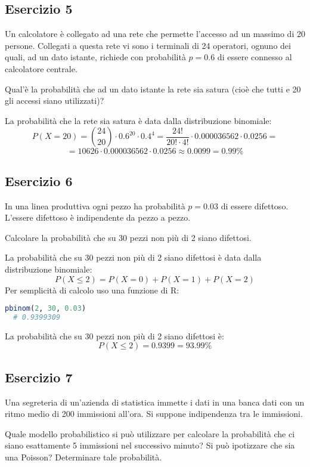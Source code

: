 \documentclass[a4paper]{article}
\theoremstyle{break}
\theoremstyle{break}
\theoremstyle{break}
\theoremstyle{break}
\begin{document}
\subsection{Esercizio 5}
Un calcolatore è collegato ad una rete che permette l'accesso ad un massimo di 20 persone.
Collegati a questa rete vi sono i terminali di 24 operatori, ognuno dei quali, ad un dato
istante, richiede con probabilità \( p = 0.6 \) di essere connesso al calcolatore centrale.

\noindent Qual'è la probabilità che ad un dato istante la rete sia satura (cioè che tutti
e 20 gli accessi siano utilizzati)?

\vspace{1em}
\noindent La probabilità che la rete sia satura è data dalla distribuzione binomiale:
\[
	P(X = 20) = \binom{24}{20} \cdot 0.6^{20} \cdot 0.4^4 = \frac{24!}{20! \cdot 4!} \cdot
	0.000036562 \cdot 0.0256 =
\]
\[
	= 10626 \cdot 0.000036562 \cdot 0.0256 \approx 0.0099 = 0.99\%
\]

\subsection{Esercizio 6}
In una linea produttiva ogni pezzo ha probabilità \( p = 0.03 \) di essere difettoso.
L'essere difettoso è indipendente da pezzo a pezzo.

\noindent Calcolare la probabilità che su 30 pezzi non più di 2 siano difettosi.

\vspace{1em}
\noindent La probabilità che su 30 pezzi non più di 2 siano difettosi è data dalla distribuzione
binomiale:
\[
	P(X \le 2) = P(X = 0) + P(X = 1) + P(X = 2)
\]
Per semplicità di calcolo uso una funzione di R:
\begin{lstlisting}[language=R]
  pbinom(2, 30, 0.03)
  # 0.9399309
\end{lstlisting}
La probabilità che su 30 pezzi non più di 2 siano difettosi è:
\[
	P(X \le 2) = 0.9399 = 93.99\%
\]

\subsection{Esercizio 7}
Una segreteria di un'azienda di statistica immette i dati in una banca dati con un ritmo
medio di 200 immissioni all'ora. Si suppone indipendenza tra le immissioni.

\noindent Quale modello probabilistico si può utilizzare per calcolare la probabilità che
ci siano esattamente 5 immissioni nel successivo minuto? Si può ipotizzare che sia una
Poisson? Determinare tale probabilità.
\end{document}
